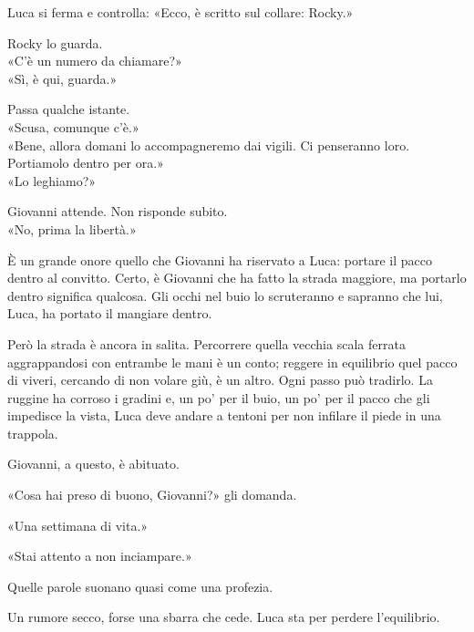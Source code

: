 \documentclass[10pt,oneside]{extbook}
\begin{document}
\par\medskip
Luca si ferma e controlla:
«Ecco, \`e scritto sul collare: Rocky.»

\par\medskip
Rocky lo guarda.\\
«C’\`e un numero da chiamare?»\\
«Sì, \`e qui, guarda.»

\par\medskip
Passa qualche istante.\\
«Scusa, comunque c’\`e.»\\
«Bene, allora domani lo accompagneremo dai vigili. Ci penseranno loro. Portiamolo dentro per ora.»\\
«Lo leghiamo?»

\par\medskip
Giovanni attende. Non risponde subito.\\
«No, prima la libertà.»

\par\medskip
\`E un grande onore quello che Giovanni ha riservato a Luca: portare il pacco dentro al convitto. Certo, \`e Giovanni che ha fatto la strada maggiore, ma portarlo dentro significa qualcosa. Gli occhi nel buio lo scruteranno e sapranno che lui, Luca, ha portato il mangiare dentro.

\par\medskip
Però la strada \`e ancora in salita. Percorrere quella vecchia scala ferrata aggrappandosi con entrambe le mani \`e un conto; reggere in equilibrio quel pacco di viveri, cercando di non volare giù, \`e un altro. Ogni passo pu\`o tradirlo. La ruggine ha corroso i gradini e, un po’ per il buio, un po’ per il pacco che gli impedisce la vista, Luca deve andare a tentoni per non infilare il piede in una trappola.

\par\medskip
Giovanni, a questo, \`e abituato.

\par\medskip
«Cosa hai preso di buono, Giovanni?» gli domanda.

\par\medskip
«Una settimana di vita.»

\par\medskip
«Stai attento a non inciampare.»

\par\medskip
Quelle parole suonano quasi come una profezia.

\par\medskip
Un rumore secco, forse una sbarra che cede. Luca sta per perdere l’equilibrio.
\end{document}
